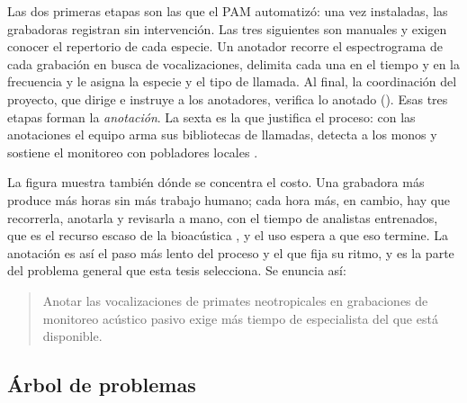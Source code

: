 Las dos primeras etapas son las que el PAM automatizó: una vez instaladas, las
grabadoras registran sin intervención. Las tres siguientes son manuales y exigen
conocer el repertorio de cada especie. Un anotador recorre el espectrograma de
cada grabación en busca de vocalizaciones, delimita cada una en el tiempo y en la
frecuencia y le asigna la especie y el tipo de llamada. Al final, la coordinación
del proyecto, que dirige e instruye a los anotadores, verifica lo anotado
(\cpEquipo). Esas tres etapas forman la \emph{anotación}. La sexta es la que
justifica el proceso: con las anotaciones el equipo arma sus bibliotecas de
llamadas, detecta a los monos y sostiene el monitoreo con pobladores locales
\citep{wiredamazon_8primates}.

La figura muestra también dónde se concentra el costo. Una grabadora más produce
más horas sin más trabajo humano; cada hora más, en cambio, hay que recorrerla,
anotarla y revisarla a mano, con el tiempo de analistas entrenados, que es el
recurso escaso de la bioacústica \citep{stowell_computational_2022}, y el uso
espera a que eso termine. La anotación es así el paso más lento del proceso y el
que fija su ritmo, y es la parte del problema general que esta tesis selecciona.
Se enuncia así:

\begin{quote}
    Anotar las vocalizaciones de primates neotropicales en grabaciones de
    monitoreo acústico pasivo exige más tiempo de especialista del que está
    disponible.
\end{quote}

\subsection{Árbol de problemas}
\label{sec:arbol}

